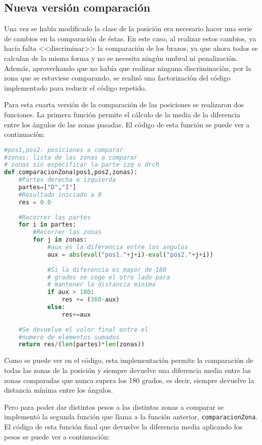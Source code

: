 {\subsection{Nueva versión comparación}
Una vez se había modificado la clase de la posición era necesario hacer una serie de cambios en la comparación de éstas. En este caso, al realizar estos cambios, ya hacía falta <<discriminar>> la comparación de los brazos, ya que ahora todos se calculan de la misma forma y no se necesita ningún umbral ni penalización. Además, aprovechando que no había que realizar ninguna discriminación, por la zona que se estuviese comparando, se realizó una factorización del código implementado para reducir el código repetido.

Para esta cuarta versión de la comparación de las posiciones se realizaron dos funciones. La primera función permite el cálculo de la media de la diferencia entre los ángulos de las zonas pasadas. El código de esta función se puede ver a continuación:

\begin{lstlisting}[language=Python]
#pos1,pos2: posiciones a comparar
#zonas: lista de las zonas a comparar
# zonas sin especificar la parte izq o drch
def comparacionZona(pos1,pos2,zonas):
	#Partes derecha e izquierda
	partes=["D","I"]
	#Resultado iniciado a 0
	res = 0.0
	
	#Recorrer las partes
	for i in partes:
		#Recorrer las zonas
		for j in zonas:
			#aux es la diferencia entre los angulos
			aux = abs(eval("pos1."+j+i)-eval("pos2."+j+i))
	
			#Si la diferencia es mayor de 180
			# grados se coge el otro lado para
			# mantener la distancia minima
			if aux > 180:
				res += (360-aux)
			else:
				res+=aux
	
	#Se devuelve el valor final entre el
	#numero de elementos sumados
	return res/(len(partes)*len(zonas))
\end{lstlisting}

Como se puede ver en el código, esta implementación permite la comparación de todas las zonas de la posición y siempre devuelve una diferencia media entre las zonas comparadas que nunca supera los 180 grados, es decir, siempre devuelve la distancia mínima entre los ángulos.

Pero para poder dar distintos pesos a las distintas zonas a comparar se implementó la segunda función que llama a la función anterior, \texttt{comparacionZona}. El código de esta función final que devuelve la diferencia media aplicando los pesos se puede ver a continuación:

}
